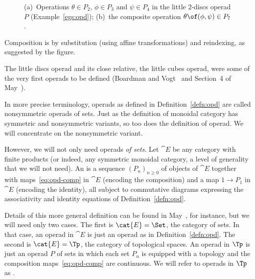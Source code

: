 \begin{examples}
\begin{enumerate}
\begin{figure}
\begin{picture}
\end{picture}%
\caption{(a)~Operations $\theta \in P_2$, $\phi \in P_3$ and $\psi \in
P_4$ in the little $2$-discs operad $P$
(Example~\ref{egs:opd}); (b)~the composite
operation $\theta \of (\phi, \psi) \in P_7$.}  
\end{figure}
% 
Composition is by substitution (using affine transformations) and
reindexing, as suggested by the figure.  

The little discs operad and its close relative, the little cubes operad,
were some of the very first operads to be defined (Boardman%
%
% 
and Vogt~\cite{BoVo}%
%
% 
and Section~4 of May~\cite{MayGIL}).%
%
\end{enumerate}
\end{examples}

In more precise terminology, operads as defined in
Definition~\ref{defn:opd} are called nonsymmetric operads of sets.  Just as
the definition of monoidal category has symmetric and nonsymmetric
variants, so too does the definition of operad.  We will concentrate on the
nonsymmetric variant.

However, we will not only need operads \emph{of sets}.  Let $\cat{E}$ be
any category with finite products (or indeed, any symmetric monoidal
category, a level of generality that we will not need).  An  is a sequence $(P_n)_{n \geq 0}$ of objects of $\cat{E}$
together with maps~\eqref{eq:opd-comp} in $\cat{E}$ (encoding the
composition) and a map $1 \to P_1$ in $\cat{E}$ (encoding the identity),
all subject to commutative diagrams expressing the associativity and
identity equations of Definition~\ref{defn:opd}.

Details of this more general definition can be found in May~\cite{MayDOA},
for instance, but we will need only two cases.  The first is $\cat{E} =
\Set$, the category of sets.  In that case, an operad in $\cat{E}$
is just an operad as in Definition~\ref{defn:opd}.  The second is $\cat{E}
= \Tp$, the category of topological spaces.  An operad in $\Tp$ is
just an operad $P$ of sets in which each set $P_n$ is equipped with a
topology and the composition maps~\eqref{eq:opd-comp} are continuous. We
will refer to operads in $\Tp$ as .

